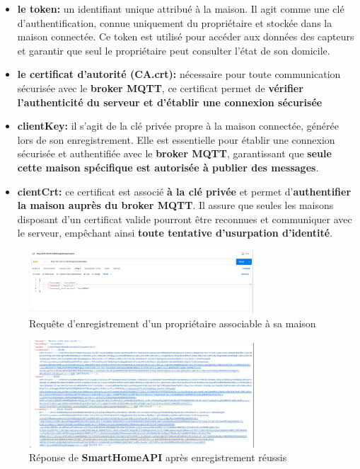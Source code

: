 \documentclass[10pt, a4paper]{report}
\begin{document}
	\begin{itemize}
		\item \textbf{le token:} un identifiant unique attribué à la maison. Il agit comme une clé d’authentification, connue uniquement du propriétaire et stockée dans la maison connectée. Ce token est utilisé pour accéder aux données des capteurs et garantir que seul le propriétaire peut consulter l’état de son domicile.
		
		\item \textbf{le certificat d’autorité (CA.crt):} nécessaire pour toute communication sécurisée avec le \textbf{broker MQTT}, ce certificat permet de \textbf{vérifier l’authenticité du serveur et d’établir une connexion sécurisée}
		
		\item \textbf{clientKey:} il s’agit de la clé privée propre à la maison connectée, générée lors de son enregistrement. Elle est essentielle pour établir une connexion sécurisée et authentifiée avec le \textbf{broker MQTT}, garantissant que \textbf{seule cette maison spécifique est autorisée à publier des messages}.
		
		\item \textbf{cientCrt: } ce certificat est associé \textbf{à la clé privée} et permet d’\textbf{authentifier la maison auprès du broker MQTT}. Il assure que seules les maisons disposant d’un certificat valide pourront être reconnues et communiquer avec le serveur, empêchant ainsi \textbf{toute tentative d’usurpation d’identité}. 
	\end{itemize}
	
	\begin{figure}[h!]
		\centering
		\includegraphics[width=0.75\textwidth]{ressources/img/preuves/creerMaisonRequete}
		\caption{Requête d'enregistrement d'un propriétaire associable à sa maison}
		\label{fig:preuveRequeteCreate}
	\end{figure}
	
		\newpage
		
	\begin{figure}[h!]
		\centering
		\includegraphics[width=0.75\textwidth]{ressources/img/preuves/creerMaisonReponse}
		\caption{Réponse de \textbf{SmartHomeAPI} après enregistrement réussis}
		\label{fig:preuveResponseCreate}
	\end{figure}
	
\end{document}
